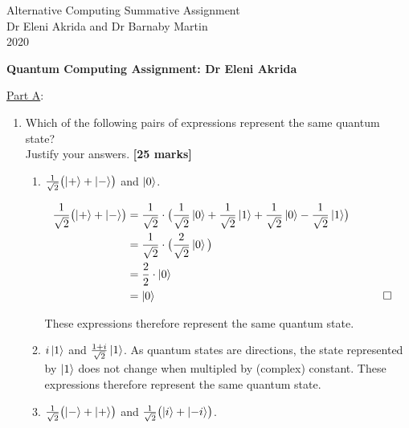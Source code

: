 \documentclass{article}
\begin{document}
\begin{center}
	\LARGE{Alternative Computing Summative Assignment}\\[0.1cm]
	\Large{Dr Eleni Akrida and Dr Barnaby Martin}\\[0.1cm]
	2020\\[0.5cm]
\end{center}

\begin{center}
\large
{\bf Quantum Computing Assignment: Dr Eleni Akrida}\bigskip

\normalsize
\end{center}

\noindent\underline{Part A}:

\begin{enumerate}
	\item \label{ex1} Which of the following pairs of expressions represent the same quantum
	state?\\
	Justify your answers.  \hfill{\bf [25 marks]}\smallskip
	\begin{enumerate}
		\item $\frac{1}{\sqrt{2}} \bigl(\ket{+} + \ket{-}\bigr)$ and $\ket0$.

\begin{align*}
    \frac{1}{\sqrt{2}} \bigl(\ket{+} + \ket{-}\bigr)  &= \frac{1}{\sqrt{2}} \cdot \bigl(\frac{1}{\sqrt{2}}\ket{0} + \frac{1}{\sqrt{2}}\ket{1} + \frac{1}{\sqrt{2}}\ket{0} - \frac{1}{\sqrt{2}}\ket{1}\bigr) \\
    &= \frac{1}{\sqrt{2}} \cdot \bigl(\frac{2}{\sqrt{2}} \ket{0} \bigl) \\
    &= \frac{2}{2} \cdot \ket{0} \\
    &= \ket{0} &&\qedhere
\end{align*}

These expressions therefore represent the same quantum state.
\newline

		\item $i \ket{1}$ and $\frac{1+i}{\sqrt{2}} \ket{1}$.
\newline
\newline
As quantum states are directions, the state represented by $\ket{1}$ does not change when multipled by (complex) constant. These expressions therefore represent the same quantum state.
\newline

		\item $\frac{1}{\sqrt{2}} \bigl(\ket{-} + \ket{+}\bigr)$ and $\frac{1}{\sqrt{2}} \bigl(\ket{i} + \ket{-i}\bigr)$.


\end{enumerate}
\end{enumerate}
\end{document}
